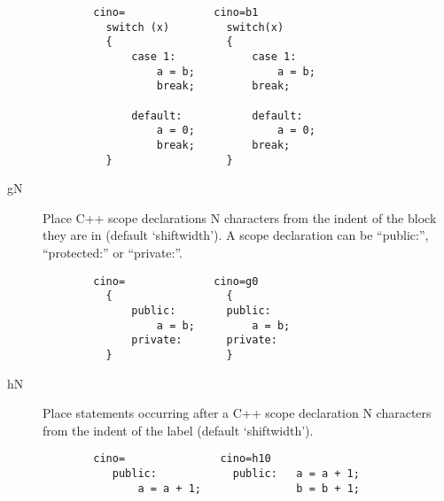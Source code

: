 \begin{description}
\begin{verbatim}
        cino=              cino=b1
          switch (x)         switch(x)
          {                  {
              case 1:            case 1:
                  a = b;             a = b;
                  break;         break;

              default:           default:
                  a = 0;             a = 0;
                  break;         break;
          }                  }
 \end{verbatim}
 
    \item[gN] Place C++ scope declarations N characters from the indent of the
          block they are in  (default `shiftwidth').  A scope declaration
          can be ``public:'', ``protected:'' or ``private:''.
\begin{verbatim}
        cino=              cino=g0
          {                  {
              public:        public:
                  a = b;         a = b;
              private:       private:
          }                  }
\end{verbatim}

    \item[hN] Place statements occurring after a C++ scope declaration N
          characters from the indent of the label  (default
          `shiftwidth').
\begin{verbatim}
        cino=               cino=h10
           public:            public:   a = a + 1;
               a = a + 1;               b = b + 1;
 

\end{verbatim}
\end{description}
